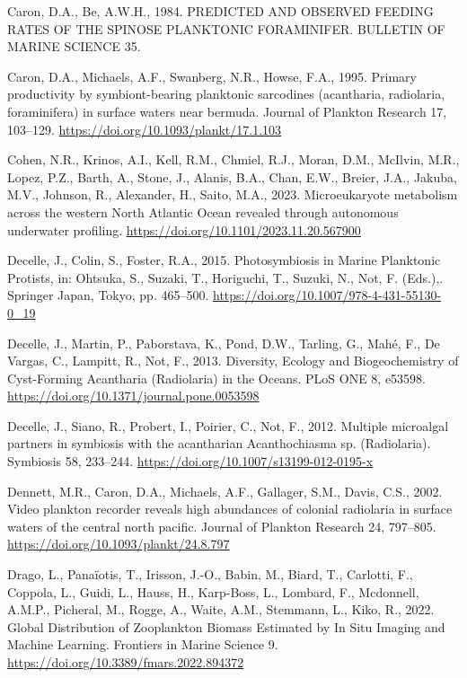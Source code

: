 \documentclass[
]{article}
\newlength{\cslhangindent}
\newenvironment{CSLReferences}[2] %
 {\begin{list}{}{%
  \setlength{\itemindent}{0pt}
  \setlength{\leftmargin}{0pt}
  \setlength{\parsep}{0pt}
  \ifodd #1
   \setlength{\leftmargin}{\cslhangindent}
   \setlength{\itemindent}{-1\cslhangindent}
  \fi
  \setlength{\itemsep}{#2\baselineskip}}}
 {\end{list}}
\begin{document}
\begin{CSLReferences}{1}{0}
Caron, D.A., Be, A.W.H., 1984. PREDICTED AND OBSERVED FEEDING RATES OF
THE SPINOSE PLANKTONIC FORAMINIFER. BULLETIN OF MARINE SCIENCE 35.

Caron, D.A., Michaels, A.F., Swanberg, N.R., Howse, F.A., 1995. Primary
productivity by symbiont-bearing planktonic sarcodines (acantharia,
radiolaria, foraminifera) in surface waters near bermuda. Journal of
Plankton Research 17, 103--129.
\url{https://doi.org/10.1093/plankt/17.1.103}

Cohen, N.R., Krinos, A.I., Kell, R.M., Chmiel, R.J., Moran, D.M.,
McIlvin, M.R., Lopez, P.Z., Barth, A., Stone, J., Alanis, B.A., Chan,
E.W., Breier, J.A., Jakuba, M.V., Johnson, R., Alexander, H., Saito,
M.A., 2023. Microeukaryote metabolism across the western North Atlantic
Ocean revealed through autonomous underwater profiling.
\url{https://doi.org/10.1101/2023.11.20.567900}

Decelle, J., Colin, S., Foster, R.A., 2015. Photosymbiosis in Marine
Planktonic Protists, in: Ohtsuka, S., Suzaki, T., Horiguchi, T., Suzuki,
N., Not, F. (Eds.),. Springer Japan, Tokyo, pp. 465--500.
\url{https://doi.org/10.1007/978-4-431-55130-0_19}

Decelle, J., Martin, P., Paborstava, K., Pond, D.W., Tarling, G., Mahé,
F., De Vargas, C., Lampitt, R., Not, F., 2013. Diversity, Ecology and
Biogeochemistry of Cyst-Forming Acantharia (Radiolaria) in the Oceans.
PLoS ONE 8, e53598. \url{https://doi.org/10.1371/journal.pone.0053598}

Decelle, J., Siano, R., Probert, I., Poirier, C., Not, F., 2012.
Multiple microalgal partners in symbiosis with the acantharian
Acanthochiasma sp. (Radiolaria). Symbiosis 58, 233--244.
\url{https://doi.org/10.1007/s13199-012-0195-x}

Dennett, M.R., Caron, D.A., Michaels, A.F., Gallager, S.M., Davis, C.S.,
2002. Video plankton recorder reveals high abundances of colonial
radiolaria in surface waters of the central north pacific. Journal of
Plankton Research 24, 797--805.
\url{https://doi.org/10.1093/plankt/24.8.797}

Drago, L., Panaïotis, T., Irisson, J.-O., Babin, M., Biard, T.,
Carlotti, F., Coppola, L., Guidi, L., Hauss, H., Karp-Boss, L., Lombard,
F., Mcdonnell, A.M.P., Picheral, M., Rogge, A., Waite, A.M., Stemmann,
L., Kiko, R., 2022. Global Distribution of Zooplankton Biomass Estimated
by In Situ Imaging and Machine Learning. Frontiers in Marine Science 9.
\url{https://doi.org/10.3389/fmars.2022.894372}


\end{CSLReferences}
\end{document}
